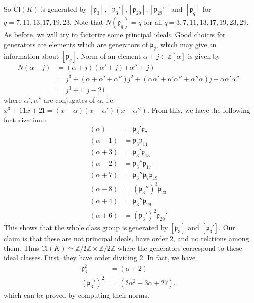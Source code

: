 \documentclass{article}
\newcommand{\Cl}{\mathrm{Cl}}
\begin{document}
So $\Cl(K)$ is generated by $[\mathfrak{p}_{3}], [\mathfrak{p}_{3}'], [\mathfrak{p}_{29}], [\mathfrak{p}_{29}']$ and $[\mathfrak{p}_{q}]$ for $q = 7, 11, 13, 17, 19, 23$. Note that $N(\mathfrak{p}_{q}) = q$ for all $q = 3, 7, 11, 13, 17, 19, 23, 29$. 
As before, we will try to factorize some principal ideals. Good choices for generators are elements which are generators of $\mathfrak{p}_{q}$, which may give an information about $[\mathfrak{p}_{q}]$. 
Norm of an element $\alpha + j\in \mathbb{Z}[\alpha]$ is given by 
\begin{align*}
N(\alpha + j) &= (\alpha +j)(\alpha' + j)(\alpha''+j) \\
&= j^{3} + (\alpha + \alpha'+\alpha'')j^{2} + (\alpha\alpha'+\alpha'\alpha''+\alpha''\alpha)j + \alpha\alpha'\alpha''\\
&= j^{3} + 11j -21
\end{align*}
where $\alpha', \alpha''$ are conjugates of $\alpha$, i.e. $x^{3} +11x+21 = (x-\alpha)(x-\alpha')(x-\alpha'')$. 
From this, we have the following factorizations: 
\begin{align*}
(\alpha) &= \mathfrak{p}_{3}'\mathfrak{p}_{7} \\
(\alpha - 1) &= \mathfrak{p}_{3}\mathfrak{p}_{11} \\
(\alpha + 3) &= \mathfrak{p}_{3}'\mathfrak{p}_{13} \\
(\alpha - 2) &= \mathfrak{p}_{3}''\mathfrak{p}_{17}\\
(\alpha + 7) &= \mathfrak{p}_{3}''\mathfrak{p}_{7}\mathfrak{p}_{19} \\
(\alpha - 8) &= (\mathfrak{p}_{3}'')^{3}\mathfrak{p}_{23}\\
(\alpha + 4) &= \mathfrak{p}_{3}''\mathfrak{p}_{29} \\
(\alpha + 6) &= (\mathfrak{p}_{3}')^{2}\mathfrak{p}_{29}'
\end{align*}
This shows that the whole class group is generated by $[\mathfrak{p}_{3}]$ and $[\mathfrak{p}_{3}']$. 
Our claim is that these are not principal ideals, have order 2, and no relations among them. Thus $\Cl(K)\simeq \mathbb{Z}/2\mathbb{Z}\times\mathbb{Z}/2\mathbb{Z}$ where the generators correspond to these ideal classes. First, they have order dividing 2. In fact, we have
\begin{align*}
\mathfrak{p}_{3}^{2} &= (\alpha + 2) \\
(\mathfrak{p}_{3}')^{2} &=(2\alpha^{2} - 3\alpha + 27). 
\end{align*}
which can be proved by computing their norms. 
\end{document}
